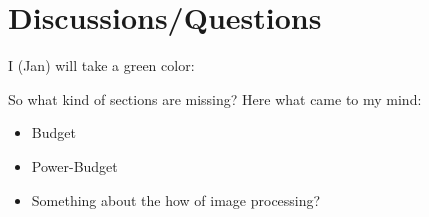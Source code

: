 \documentclass[fontsize=11pt,paper=a4,]{scrartcl}
\begin{document}
\section{Discussions/Questions}

I (Jan) will take {\color{green} a green color}:

{\color{green} So what kind of sections are missing? Here what came to my mind:
\begin{itemize}
 \item Budget
 \item Power-Budget
 \item Something about the how of image processing?
\end{itemize}
}


\newpage
\printbibliography
{}
\pagestyle{plain}
\end{document}
